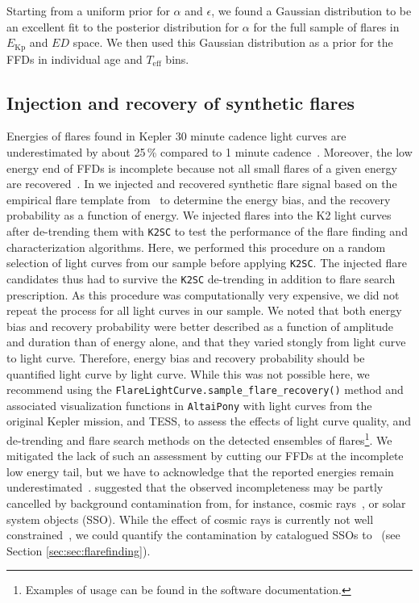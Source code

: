 \documentclass{aa}
\begin{document}
Starting from a uniform prior for $\alpha$ and $\epsilon$, we found a Gaussian distribution to be an excellent fit to the posterior distribution for $\alpha$ for the full sample of flares in $E_\mathrm{Kp}$ and $ED$ space. We then used this Gaussian distribution as a prior for the FFDs in individual age and $T_\mathrm{eff}$ bins. 
\subsection{Injection and recovery of synthetic flares}
\label{sec:sec:injrec}
Energies of flares found in Kepler 30 minute cadence light curves are underestimated by about 25\,\% compared to 1 minute cadence~\citep{yang_flaresampling_2018}. Moreover, the low energy end of FFDs is incomplete because not all small flares of a given energy are recovered~\citep{davenport_kepler_2016}. In  we injected and recovered synthetic flare signal based on the empirical flare template from~\citet{davenport_kepler_2014} to determine the energy bias, and the recovery probability as a function of energy. We injected flares into the K2 light curves after de-trending them with \texttt{K2SC} to test the performance of the flare finding and characterization algorithms. Here, we performed this procedure on a random selection of light curves from our sample before applying \texttt{K2SC}. The injected flare candidates thus had to survive the \texttt{K2SC} de-trending in addition to flare search prescription. As this procedure was computationally very expensive, we did not repeat the process for all light curves in our sample. We noted that both energy bias and recovery probability were better described as a function of amplitude and duration than of energy alone, and that they varied stongly from light curve to light curve. Therefore, energy bias and recovery probability should be quantified light curve by light curve. While this was not possible here, we recommend using the \texttt{FlareLightCurve.sample\_flare\_recovery()} method and associated visualization functions in \texttt{AltaiPony} with light curves from the original Kepler mission, and TESS, to assess the effects of light curve quality, and de-trending and flare search methods on the detected ensembles of flares\footnote{Examples of usage can be found in the software documentation.}. We mitigated the lack of such an assessment by cutting our FFDs at the incomplete low energy tail, but we have to acknowledge that the reported energies remain underestimated~\citep{yang_flaresampling_2018}. \citet{aschwanden_powerlaws_2015} suggested that the observed incompleteness may be partly cancelled by background contamination from, for instance, cosmic rays~, or solar system objects (SSO). While the effect of cosmic rays is currently not well constrained~, we could quantify the contamination by catalogued SSOs to ~(see Section \ref{sec:sec:flarefinding}).
\end{document}
